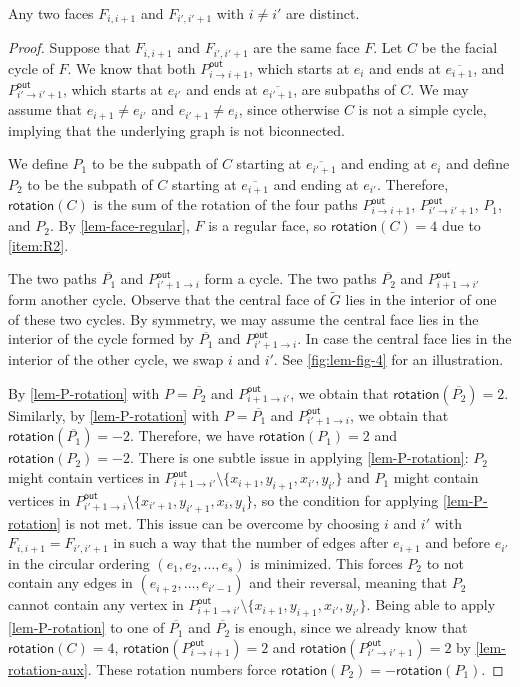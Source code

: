 \documentclass{theoretics}
\newcommand{\Pout}{P^{\mathsf{out}}}
\newcommand{\rotation}{\mathsf{rotation}}
\begin{document}
\begin{lemma}\label{lem-face-distinct}
Any two faces $F_{i,i+1}$ and $F_{i',i'+1}$ with $i \neq i'$ are distinct. 
\end{lemma}
\begin{proof}
Suppose that $F_{i,i+1}$ and $F_{i',i'+1}$ are the same face $F$. Let $C$ be the facial cycle of $F$. We know that both $\Pout_{i \rightarrow i+1}$, which starts at $e_i$ and ends at $\overline{e_{i+1}}$, and $\Pout_{i' \rightarrow i'+1}$, which starts at $e_{i'}$ and ends at $\overline{e_{i'+1}}$, are subpaths of $C$. We may assume that $e_{i+1} \neq e_{i'}$ and $e_{i'+1} \neq e_i$, since otherwise $C$ is not a simple cycle, implying that the underlying graph is not biconnected.


We define $P_1$ to be the subpath of $C$ starting at $\overline{e_{i'+1}}$ and ending at $e_i$ and define $P_2$ to be the subpath of $C$ starting at $\overline{e_{i+1}}$ and ending at $e_{i'}$.
Therefore, $\rotation(C)$ is the sum of the rotation of the four paths $\Pout_{i \rightarrow i+1}$, $\Pout_{i' \rightarrow i'+1}$, $P_1$, and $P_2$. By \cref{lem-face-regular}, $F$ is a regular face, so $\rotation(C)=4$ due to \ref{item:R2}. 

The two paths $\overline{P_1}$ and $\Pout_{i'+1 \rightarrow i}$ form a cycle. The two paths $\overline{P_2}$ and $\Pout_{i+1 \rightarrow i'}$ form another cycle. Observe that the central face of $\tilde{G}$ lies in the interior of one of these two cycles. By symmetry, we may assume the central face lies in the interior of the cycle formed by $\overline{P_1}$ and $\Pout_{i'+1 \rightarrow i}$. In case the central face lies in the interior of the other cycle, we swap $i$ and $i'$. See \cref{fig:lem-fig-4} for an illustration.


By \cref{lem-P-rotation} with $P = \overline{P_2}$ and $\Pout_{i+1\rightarrow i'}$, we obtain that $\rotation(\overline{P_2}) = 2$.
Similarly, by \cref{lem-P-rotation} with $P = \overline{P_1}$ and $\Pout_{i'+1\rightarrow i}$,
we obtain that  $\rotation(\overline{P_1}) = -2$.
Therefore, we have $\rotation(P_1) = 2$ and $\rotation(P_2) = -2$. There is one subtle issue in applying \cref{lem-P-rotation}:  $P_2$ might contain vertices in $\Pout_{i+1\rightarrow i'} \setminus \{x_{i+1}, y_{i+1}, x_{i'}, y_{i'}\}$ and $P_1$ might contain vertices in $\Pout_{i'+1\rightarrow i} \setminus \{x_{i'+1}, y_{i'+1}, x_{i}, y_{i}\}$, so the condition for applying  \cref{lem-P-rotation} is not met. This issue can be overcome by choosing $i$ and $i'$ with $F_{i,i+1} = F_{i',i'+1}$ in such a way that the number of edges after $e_{i+1}$ and before $e_{i'}$ in the circular ordering $(e_{1}, e_{2}, \ldots, e_{s})$ is minimized. This forces $P_2$ to not contain any edges in $(e_{i+2}, \ldots, e_{i'-1})$ and their reversal, meaning that $P_2$ cannot contain any vertex in $\Pout_{i+1\rightarrow i'} \setminus \{x_{i+1}, y_{i+1}, x_{i'}, y_{i'}\}$.  Being able to apply  \cref{lem-P-rotation} to one of $\overline{P_1}$ and $\overline{P_2}$ is enough, since we already know that $\rotation(C)=4$, $\rotation(\Pout_{i \rightarrow i+1}) = 2$ and  $\rotation(\Pout_{i' \rightarrow i'+1})=2$ by \cref{lem-rotation-aux}. These rotation numbers force $\rotation(P_2) = -\rotation(P_1)$.


\end{proof}
\end{document}
